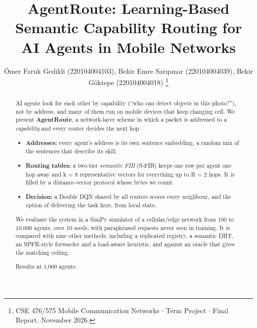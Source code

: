 \documentclass[journal]{IEEEtran}
\begin{document}
\title{AgentRoute: Learning-Based Semantic Capability Routing for AI Agents in Mobile Networks}

\author{%
\"Omer Faruk Gedikli (220104004103), Bekir Emre Sar{\i}p{\i}nar (220104004039), Bekir G\"oktepe (220104004018)%
\thanks{CSE 476/575 Mobile Communication Networks $\cdot$ Term Project $\cdot$ Final Report. November 2026.}}

\maketitle

\begin{abstract}
AI agents look for each other by capability (``who can detect objects in this photo?''), not by address, and many of them run on mobile devices that keep changing cell. We present \textbf{AgentRoute}, a network-layer scheme in which a packet is addressed to a \emph{capability} and every router decides the next hop.

\begin{itemize}
\item \textbf{Addresses:} every agent's address is its own sentence embedding, a random mix of the sentences that describe its skill.
\item \textbf{Routing tables:} a two-tier \emph{semantic FIB} (S-FIB) keeps one row per agent one hop away and k = 8 representative vectors for everything up to R = 2 hops. It is filled by a distance-vector protocol whose bytes we count.
\item \textbf{Decision:} a Double DQN shared by all routers scores every neighbour, and the option of delivering the task here, from local state.
\end{itemize}

We evaluate the system in a SimPy simulator of a cellular/edge network from 100 to 10,000 agents, over 10 seeds, with paraphrased requests never seen in training. It is compared with nine other methods, including a replicated registry, a semantic DHT, an SPFR-style forwarder and a load-aware heuristic, and against an oracle that gives the matching ceiling.

Results at 1,000 agents:


\end{abstract}
\end{document}
